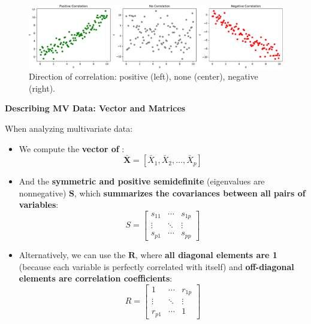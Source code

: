 \begin{figure}[!htp]
    \centering
    \includegraphics[width=\textwidth]{img/correlation.pdf}
    \caption{Direction of correlation: positive (left), none (center), negative (right).}
\end{figure}

\newpage

\begin{flushleft}
    \textcolor{Green3}{ \textbf{Describing MV Data: Vector and Matrices}}
\end{flushleft}
When analyzing multivariate data:
\begin{itemize}
    \item We compute the \textbf{vector of }:
    \begin{equation}
        \bar{\mathbf{X}} = [\bar{X}_{1}, \bar{X}_{2}, \dots, \bar{X}_{p}]
    \end{equation}

    \item And the \textbf{symmetric and positive semidefinite} (eigenvalues are nonnegative)  $ \mathbf{S} $, which \textbf{summarizes the covariances between all pairs of variables}:
    \begin{equation}
        S =
        \begin{bmatrix}
            s_{11} & \cdots & s_{1p} \\
            \vdots & \ddots & \vdots \\
            s_{p1} & \cdots & s_{pp}
        \end{bmatrix}
    \end{equation}

    \item Alternatively, we can use the  $ \mathbf{R} $, where \textbf{all diagonal elements are 1} (because each variable is perfectly correlated with itself) and \textbf{off-diagonal elements are correlation coefficients}:
    \begin{equation}
        R =
        \begin{bmatrix}
            1      & \cdots & r_{1p} \\
            \vdots & \ddots & \vdots \\
            r_{p1} & \cdots & 1
        \end{bmatrix}
    \end{equation}
\end{itemize}

